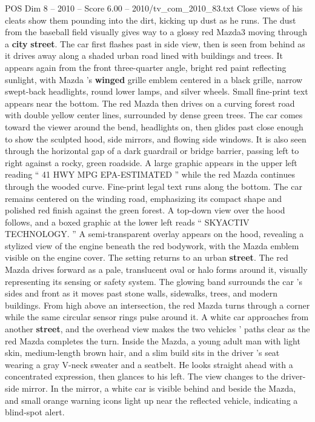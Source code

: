 \begin{textsample}{POS Dim 8 – 2010 – Score 6.00 – 2010/tv\_com\_2010\_83.txt}
Close views of his cleats show them pounding into the dirt, kicking up dust as he runs.
The dust from the baseball field visually gives way to a glossy red Mazda3 moving through a \textbf{city} \textbf{street}.
The car first flashes past in side view, then is seen from behind as it drives away along a shaded urban road lined with buildings and trees.
It appears again from the front three-quarter angle, bright red paint reflecting sunlight, with Mazda ’s \textbf{winged} grille emblem centered in a black grille, narrow swept-back headlights, round lower lamps, and silver wheels.
Small fine-print text appears near the bottom.
The red Mazda then drives on a curving forest road with double yellow center lines, surrounded by dense green trees.
The car comes toward the viewer around the bend, headlights on, then glides past close enough to show the sculpted hood, side mirrors, and flowing side windows.
It is also seen through the horizontal gap of a dark guardrail or bridge barrier, passing left to right against a rocky, green roadside.
A large graphic appears in the upper left reading “ 41 HWY MPG EPA-ESTIMATED ” while the red Mazda continues through the wooded curve.
Fine-print legal text runs along the bottom.
The car remains centered on the winding road, emphasizing its compact shape and polished red finish against the green forest.
A top-down view over the hood follows, and a boxed graphic at the lower left reads “ SKYACTIV TECHNOLOGY. ” A semi-transparent overlay appears on the hood, revealing a stylized view of the engine beneath the red bodywork, with the Mazda emblem visible on the engine cover.
The setting returns to an urban \textbf{street}.
The red Mazda drives forward as a pale, translucent oval or halo forms around it, visually representing its sensing or safety system.
The glowing band surrounds the car ’s sides and front as it moves past stone walls, sidewalks, trees, and modern buildings.
From high above an intersection, the red Mazda turns through a corner while the same circular sensor rings pulse around it.
A white car approaches from another \textbf{street}, and the overhead view makes the two vehicles ’ paths clear as the red Mazda completes the turn.
Inside the Mazda, a young adult man with light skin, medium-length brown hair, and a slim build sits in the driver ’s seat wearing a gray V-neck sweater and a seatbelt.
He looks straight ahead with a concentrated expression, then glances to his left.
The view changes to the driver-side mirror.
In the mirror, a white car is visible behind and beside the Mazda, and small orange warning icons light up near the reflected vehicle, indicating a blind-spot alert.

\end{textsample}
